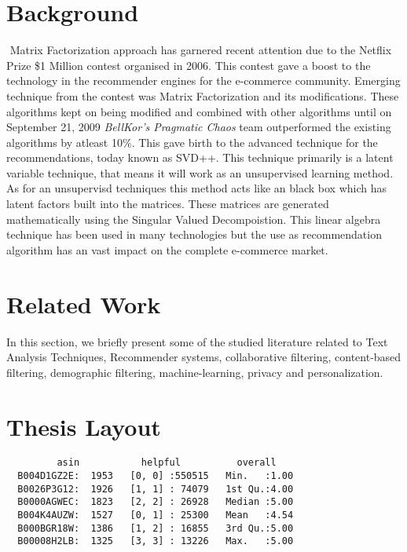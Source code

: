 \section{Background}‌​‌​‌​‌​‌​‌​‌​‌​‌​‌​‌​‌​‌​‌​‌​‌​
Matrix Factorization approach has garnered recent attention due to the Netflix Prize \$1 Million contest organised in 2006. This contest gave a boost to the technology in the recommender engines for the e-commerce community. Emerging technique from the contest was Matrix Factorization and its modifications. These algorithms kept on being modified and combined with other algorithms until on September 21, 2009 \textit{BellKor's Pragmatic Chaos} team outperformed the existing algorithms by atleast 10\%. This gave birth to the advanced technique for the recommendations, today known as SVD++. This technique primarily is a latent variable technique, that means it will work as an unsupervised learning method. As for an unsupervisd techniques this method acts like an black box which has latent factors built into the matrices. These matrices are generated mathematically using the Singular Valued Decompoistion. This linear algebra technique has been used in many technologies but the use as recommendation algorithm has an vast impact on the complete e-commerce market.


\section{Related Work}
In this section, we briefly present some of the studied literature related to Text Analysis Techniques, Recommender systems, collaborative filtering, content-based filtering, demographic filtering, machine-learning, privacy and personalization.

\section{Thesis Layout}

\begin{verbatim}
         asin           helpful          overall    
  B004D1GZ2E:  1953   [0, 0] :550515   Min.   :1.00  
  B0026P3G12:  1926   [1, 1] : 74079   1st Qu.:4.00  
  B0000AGWEC:  1823   [2, 2] : 26928   Median :5.00  
  B004K4AUZW:  1527   [0, 1] : 25300   Mean   :4.54  
  B000BGR18W:  1386   [1, 2] : 16855   3rd Qu.:5.00  
  B00008H2LB:  1325   [3, 3] : 13226   Max.   :5.00  
\end{verbatim}


